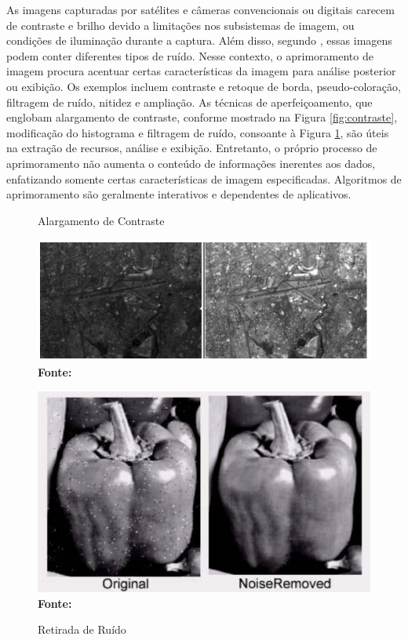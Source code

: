 As imagens capturadas por satélites e câmeras convencionais ou digitais carecem de contraste e brilho devido a limitações nos subsistemas de imagem, ou condições de iluminação durante a captura. Além disso, segundo , essas imagens podem conter diferentes tipos de ruído. Nesse contexto, o aprimoramento de imagem procura acentuar certas características da imagem para análise posterior ou exibição. Os exemplos incluem contraste e retoque de borda, pseudo-coloração, filtragem de ruído, nitidez e ampliação. As técnicas de aperfeiçoamento, que englobam alargamento de contraste, conforme mostrado na Figura \ref{fig:contraste}, modificação do histograma e filtragem de ruído, consoante à Figura \ref{fig:ruido}, são úteis na extração de recursos, análise e exibição. Entretanto, o próprio processo de aprimoramento não aumenta o conteúdo de informações inerentes aos dados, enfatizando somente certas características de imagem especificadas. Algoritmos de aprimoramento são geralmente interativos e dependentes de aplicativos.

\begin{figure}[ht]
\centering
\begin{minipage}[b]{0.45\linewidth}
\centering
\caption{Alargamento de Contraste}
\includegraphics[width=\textwidth]{figuras/Alargamento de Contraste.png}
\label{fig:contraste}
\vspace{-0.2cm}
\textbf{\footnotesize Fonte: \cite{techniques}}
\end{minipage}
\hspace{0.5cm}
\begin{minipage}[b]{0.45\linewidth}
\centering
\caption{Retirada de Ruído}
\includegraphics[width=\textwidth]{figuras/Retirada de Ruido.png}
\label{fig:ruido}
\vspace{-0.2cm}
\textbf{\footnotesize Fonte: \cite{techniques}}
\end{minipage}
\end{figure}



